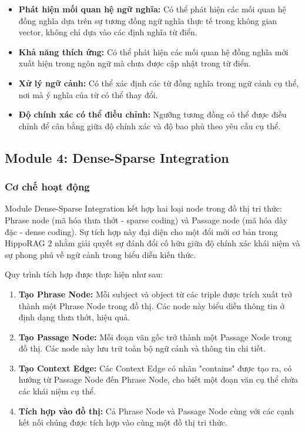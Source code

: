 \begin{itemize}
    \item \textbf{Phát hiện mối quan hệ ngữ nghĩa:} Có thể phát hiện các mối quan hệ đồng nghĩa dựa trên sự tương đồng ngữ nghĩa thực tế trong không gian vector, không chỉ dựa vào các định nghĩa từ điển.
    
    \item \textbf{Khả năng thích ứng:} Có thể phát hiện các mối quan hệ đồng nghĩa mới xuất hiện trong ngôn ngữ mà chưa được cập nhật trong từ điển.
    
    \item \textbf{Xử lý ngữ cảnh:} Có thể xác định các từ đồng nghĩa trong ngữ cảnh cụ thể, nơi mà ý nghĩa của từ có thể thay đổi.
    
    \item \textbf{Độ chính xác có thể điều chỉnh:} Ngưỡng tương đồng có thể được điều chỉnh để cân bằng giữa độ chính xác và độ bao phủ theo yêu cầu cụ thể.
\end{itemize}

\subsection{Module 4: Dense-Sparse Integration}

\subsubsection{Cơ chế hoạt động}
Module Dense-Sparse Integration kết hợp hai loại node trong đồ thị tri thức: Phrase node (mã hóa thưa thớt - sparse coding) và Passage node (mã hóa dày đặc - dense coding). Sự tích hợp này đại diện cho một đổi mới cơ bản trong HippoRAG 2 nhằm giải quyết sự đánh đổi cố hữu giữa độ chính xác khái niệm và sự phong phú về ngữ cảnh trong biểu diễn kiến thức.

Quy trình tích hợp được thực hiện như sau:
\begin{enumerate}
    \item \textbf{Tạo Phrase Node:} Mỗi subject và object từ các triple được trích xuất trở thành một Phrase Node trong đồ thị. Các node này biểu diễn thông tin ở định dạng thưa thớt, hiệu quả.
    
    \item \textbf{Tạo Passage Node:} Mỗi đoạn văn gốc trở thành một Passage Node trong đồ thị. Các node này lưu trữ toàn bộ ngữ cảnh và thông tin chi tiết.
    
    \item \textbf{Tạo Context Edge:} Các Context Edge có nhãn "contains" được tạo ra, có hướng từ Passage Node đến Phrase Node, cho biết một đoạn văn cụ thể chứa các khái niệm cụ thể.
    
    \item \textbf{Tích hợp vào đồ thị:} Cả Phrase Node và Passage Node cùng với các cạnh kết nối chúng được tích hợp vào cùng một đồ thị tri thức.
\end{enumerate}

